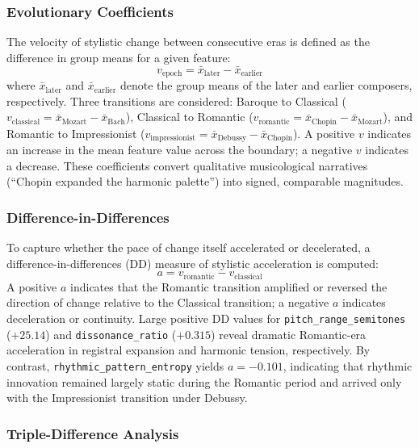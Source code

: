 \documentclass[]{interact}
\theoremstyle{plain}
\theoremstyle{definition}
\theoremstyle{remark}
\begin{document}
\subsubsection{Evolutionary Coefficients}

The velocity of stylistic change between consecutive eras is defined as the
difference in group means for a given feature:
\begin{equation}\label{eq:velocity}
  v_{\text{epoch}} = \bar{x}_{\text{later}} - \bar{x}_{\text{earlier}}
\end{equation}
where $\bar{x}_{\text{later}}$ and $\bar{x}_{\text{earlier}}$ denote the group
means of the later and earlier composers, respectively. Three transitions are
considered: Baroque to Classical ($v_{\text{classical}} = \bar{x}_{\text{Mozart}}
- \bar{x}_{\text{Bach}}$), Classical to Romantic ($v_{\text{romantic}} =
\bar{x}_{\text{Chopin}} - \bar{x}_{\text{Mozart}}$), and Romantic to
Impressionist ($v_{\text{impressionist}} = \bar{x}_{\text{Debussy}} -
\bar{x}_{\text{Chopin}}$). A positive $v$ indicates an increase in the mean
feature value across the boundary; a negative $v$ indicates a decrease. These
coefficients convert qualitative musicological narratives (``Chopin expanded the
harmonic palette'') into signed, comparable magnitudes.

\subsubsection{Difference-in-Differences}

To capture whether the pace of change itself accelerated or decelerated, a
difference-in-differences (DD) measure of stylistic acceleration is computed:
\begin{equation}\label{eq:dd}
  a = v_{\text{romantic}} - v_{\text{classical}}
\end{equation}
A positive $a$ indicates that the Romantic transition amplified or reversed the
direction of change relative to the Classical transition; a negative $a$
indicates deceleration or continuity. Large positive DD values for
\texttt{pitch\_range\_semitones} ($+25.14$) and \texttt{dissonance\_ratio}
($+0.315$) reveal dramatic Romantic-era acceleration in registral expansion and
harmonic tension, respectively. By contrast,
\texttt{rhythmic\_pattern\_entropy} yields $a = -0.101$, indicating that
rhythmic innovation remained largely static during the Romantic period and
arrived only with the Impressionist transition under Debussy.

\subsubsection{Triple-Difference Analysis}
\end{document}

